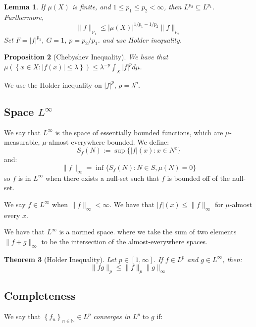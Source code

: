 \documentclass{article}
\newtheorem{theorem}{Theorem}
\newtheorem{proposition}[theorem]{Proposition}
\newtheorem{lemma}[theorem]{Lemma}
\theoremstyle{definition}
\numberwithin{theorem}{section}
\numberwithin{equation}{section}
\begin{document}
\begin{lemma}
	If $\mu(X)$ is finite, and $1 \leq p_1 \leq p_2 < \infty$, then $L^{p_2} \subseteq L^{p_1}$. Furthermore,
	\begin{equation}
		\| f\|_{p_1} \leq |\mu(X)|^{1/ p_1 - 1/p_2} \| f \|_{p_2}
	\end{equation}
	Set $F = |f|^{p_1}$, $G = 1$, $p = p_2/p_1$. and use Holder inequality.
\end{lemma}

\begin{proposition}[Chebyshev Inequality]
	We have that $\mu \left( \left\lbrace x \in X : |f(x)| \leq \lambda\right\rbrace   \right) \leq \lambda^{-p} \int_X |f|^p d{\mu}$. 
\end{proposition}
We use the Holder inequality on $|f|^p$, $\rho = \lambda^p$.

\subsection{Space $L^\infty$}
We say that $L^{\infty}$ is the space of essentially bounded functions, which are $\mu$-measurable, $\mu$-almost everywhere bounded.
We define:
\begin{equation}
	S_f(N) := \sup \lbrace |f|(x): x \in N^c \rbrace
\end{equation}
and:
\begin{equation}
	\|f \|_{\infty} = \inf \lbrace S_f(N): N \in S, \mu(N) = 0 \rbrace
\end{equation}
so $f$ is in $L^\infty$ when there exists a null-set such that $f$ is bounded off of the null-set.

We say $f \in L^\infty$ when $\|f\|_{\infty} < \infty$. 
We have that $|f|(x) \leq \|f\|_{\infty}$ for $\mu$-almost every $x$. 

We have that $L^\infty$ is a normed space. where we take the sum of two elements $\|f + g \|_{\infty}$ to be the intersection of the almost-everywhere spaces. 
\begin{theorem}[Holder Inequality]
	Let $p \in [1, \infty]$. If $f \in L^p$ and $g \in L^\infty$, then:
	\begin{equation}
		\|fg \|_p \leq \|f\|_p \|g \|_\infty
	\end{equation}
\end{theorem}

\subsection{Completeness}
We say that $\left\lbrace f_n \right\rbrace_{n \in \mathbb{N}} \in L^p$ \textit{converges in $L^p$} to $g$ if:
\end{document}
